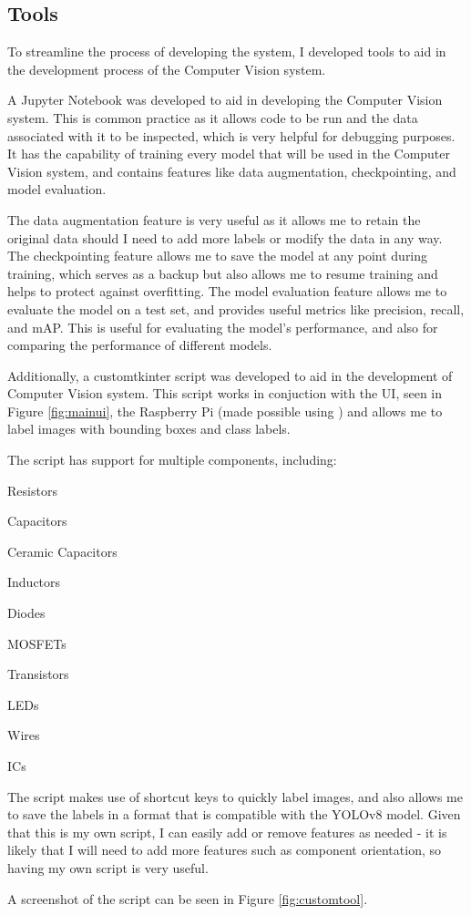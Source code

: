 \subsection{Tools}
\label{sec:tools}
To streamline the process of developing the system, I developed tools to aid in the development process of the Computer Vision system.

A Jupyter Notebook\cite{jupyter} was developed to aid in developing the Computer Vision system. This is common practice as it
allows code to be run and the data associated with it to be inspected, which is very helpful for debugging purposes. It 
has the capability of training every model that will be used in the Computer Vision system, and contains features like
data augmentation, checkpointing, and model evaluation.

The data augmentation feature is very useful as it allows me to 
retain the original data should I need to add more labels or modify the data in any way. The checkpointing feature allows
me to save the model at any point during training, which serves as a backup but also allows me to resume training and helps 
to protect against overfitting. The model evaluation feature allows me to evaluate the model on a test set, and provides
useful metrics like precision, recall, and mAP. This is useful for evaluating the model's performance, and also for
comparing the performance of different models.

Additionally, a customtkinter\cite{customtkinter} script was developed to aid in the development of Computer Vision system.
This script works in conjuction with the UI, seen in Figure \ref*{fig:mainui}, the Raspberry Pi (made possible using \citet{realvnc})
and allows me to label images with bounding boxes and class labels.

The script has support for multiple components, including:
\begin{multicols}{2}
    \begin{mylist}
        \item Resistors
        \item Capacitors
        \item Ceramic Capacitors
        \item Inductors
        \item Diodes
        \item MOSFETs
        \item Transistors
        \item LEDs
        \item Wires
        \item ICs
    \end{mylist}
\end{multicols}

The script makes use of shortcut keys to quickly label images, and also allows me to save the labels in a format that is
compatible with the YOLOv8 model. Given that this is my own script, I can easily add or remove features as needed - it is likely
that I will need to add more features such as component orientation, so having my own script is very useful.

A screenshot of the script can be seen in Figure \ref*{fig:customtool}.
